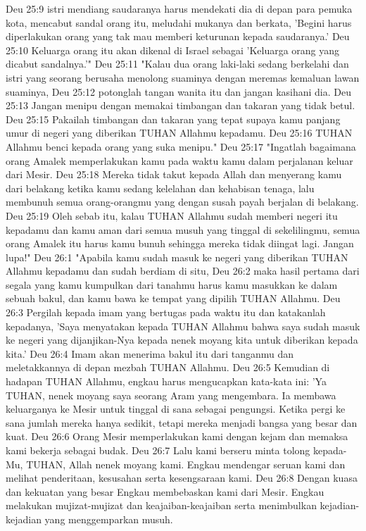 Deu 25:9  istri mendiang saudaranya harus mendekati dia di depan para pemuka kota, mencabut sandal orang itu, meludahi mukanya dan berkata, 'Begini harus diperlakukan orang yang tak mau memberi keturunan kepada saudaranya.'
Deu 25:10  Keluarga orang itu akan dikenal di Israel sebagai 'Keluarga orang yang dicabut sandalnya.'"
Deu 25:11  "Kalau dua orang laki-laki sedang berkelahi dan istri yang seorang berusaha menolong suaminya dengan meremas kemaluan lawan suaminya,
Deu 25:12  potonglah tangan wanita itu dan jangan kasihani dia.
Deu 25:13  Jangan menipu dengan memakai timbangan dan takaran yang tidak betul.
Deu 25:15  Pakailah timbangan dan takaran yang tepat supaya kamu panjang umur di negeri yang diberikan TUHAN Allahmu kepadamu.
Deu 25:16  TUHAN Allahmu benci kepada orang yang suka menipu."
Deu 25:17  "Ingatlah bagaimana orang Amalek memperlakukan kamu pada waktu kamu dalam perjalanan keluar dari Mesir.
Deu 25:18  Mereka tidak takut kepada Allah dan menyerang kamu dari belakang ketika kamu sedang kelelahan dan kehabisan tenaga, lalu membunuh semua orang-orangmu yang dengan susah payah berjalan di belakang.
Deu 25:19  Oleh sebab itu, kalau TUHAN Allahmu sudah memberi negeri itu kepadamu dan kamu aman dari semua musuh yang tinggal di sekelilingmu, semua orang Amalek itu harus kamu bunuh sehingga mereka tidak diingat lagi. Jangan lupa!"
Deu 26:1  "Apabila kamu sudah masuk ke negeri yang diberikan TUHAN Allahmu kepadamu dan sudah berdiam di situ,
Deu 26:2  maka hasil pertama dari segala yang kamu kumpulkan dari tanahmu harus kamu masukkan ke dalam sebuah bakul, dan kamu bawa ke tempat yang dipilih TUHAN Allahmu.
Deu 26:3  Pergilah kepada imam yang bertugas pada waktu itu dan katakanlah kepadanya, 'Saya menyatakan kepada TUHAN Allahmu bahwa saya sudah masuk ke negeri yang dijanjikan-Nya kepada nenek moyang kita untuk diberikan kepada kita.'
Deu 26:4  Imam akan menerima bakul itu dari tanganmu dan meletakkannya di depan mezbah TUHAN Allahmu.
Deu 26:5  Kemudian di hadapan TUHAN Allahmu, engkau harus mengucapkan kata-kata ini: 'Ya TUHAN, nenek moyang saya seorang Aram yang mengembara. Ia membawa keluarganya ke Mesir untuk tinggal di sana sebagai pengungsi. Ketika pergi ke sana jumlah mereka hanya sedikit, tetapi mereka menjadi bangsa yang besar dan kuat.
Deu 26:6  Orang Mesir memperlakukan kami dengan kejam dan memaksa kami bekerja sebagai budak.
Deu 26:7  Lalu kami berseru minta tolong kepada-Mu, TUHAN, Allah nenek moyang kami. Engkau mendengar seruan kami dan melihat penderitaan, kesusahan serta kesengsaraan kami.
Deu 26:8  Dengan kuasa dan kekuatan yang besar Engkau membebaskan kami dari Mesir. Engkau melakukan mujizat-mujizat dan keajaiban-keajaiban serta menimbulkan kejadian-kejadian yang menggemparkan musuh.
